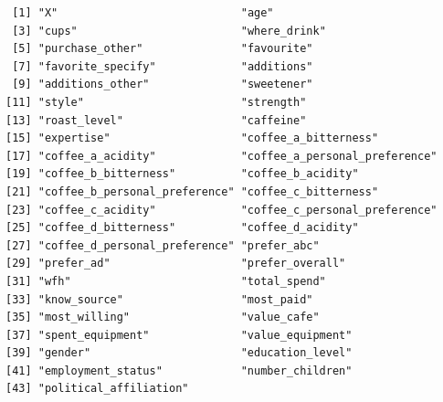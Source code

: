 \documentclass[
  letterpaper,
  DIV=11,
  numbers=noendperiod]{scrartcl}
\begin{document}
\begin{verbatim}
 [1] "X"                            "age"                         
 [3] "cups"                         "where_drink"                 
 [5] "purchase_other"               "favourite"                   
 [7] "favorite_specify"             "additions"                   
 [9] "additions_other"              "sweetener"                   
[11] "style"                        "strength"                    
[13] "roast_level"                  "caffeine"                    
[15] "expertise"                    "coffee_a_bitterness"         
[17] "coffee_a_acidity"             "coffee_a_personal_preference"
[19] "coffee_b_bitterness"          "coffee_b_acidity"            
[21] "coffee_b_personal_preference" "coffee_c_bitterness"         
[23] "coffee_c_acidity"             "coffee_c_personal_preference"
[25] "coffee_d_bitterness"          "coffee_d_acidity"            
[27] "coffee_d_personal_preference" "prefer_abc"                  
[29] "prefer_ad"                    "prefer_overall"              
[31] "wfh"                          "total_spend"                 
[33] "know_source"                  "most_paid"                   
[35] "most_willing"                 "value_cafe"                  
[37] "spent_equipment"              "value_equipment"             
[39] "gender"                       "education_level"             
[41] "employment_status"            "number_children"             
[43] "political_affiliation"       
\end{verbatim}
\end{document}
